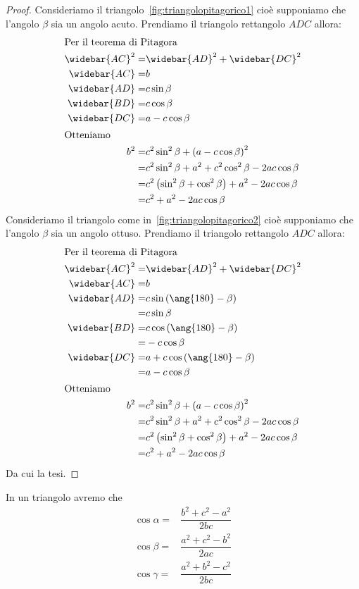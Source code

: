 \begin{proof}
	Consideriamo il triangolo~\vref{fig:triangolopitagorico1} cioè supponiamo che l'angolo $\beta$ sia un angolo acuto. Prendiamo il triangolo rettangolo $ADC$ allora:
	\begin{align*}
	\intertext{Per il teorema di Pitagora}
\widebar{AC}^2=&\widebar{AD}^2+\widebar{DC}^2\\
\widebar{AC}=&b\\
\widebar{AD}=&c\sin\beta\\
\widebar{BD}=&c\cos\beta\\
\widebar{DC}=&a-c\cos\beta\\
\intertext{Otteniamo}
b^2=&c^2\sin^2\beta+\left(a-c\cos\beta\right)^2\\
=&c^2\sin^2\beta+a^2+c^2\cos^2\beta-2ac\cos\beta\\
=&c^2\left(\sin^2\beta+\cos^2\beta\right)+a^2-2ac\cos\beta\\
=&c^2+a^2-2ac\cos\beta\\
	\end{align*}
	Consideriamo il triangolo come in~\vref{fig:triangolopitagorico2} cioè supponiamo che l'angolo $\beta$ sia un angolo ottuso. Prendiamo il triangolo rettangolo $ADC$ allora:
		\begin{align*}
	\intertext{Per il teorema di Pitagora}
	\widebar{AC}^2=&\widebar{AD}^2+\widebar{DC}^2\\
	\widebar{AC}=&b\\
	\widebar{AD}=&c\sin\left(\ang{180}-\beta\right)\\
	=&c\sin\beta\\
	\widebar{BD}=&c\cos\left(\ang{180}-\beta\right)\\
	=&-c\cos\beta\\
	\widebar{DC}=&a+c\cos\left(\ang{180}-\beta\right)\\
	=&a-c\cos\beta\\
	\intertext{Otteniamo}
	b^2=&c^2\sin^2\beta+\left(a-c\cos\beta\right)^2\\
	=&c^2\sin^2\beta+a^2+c^2\cos^2\beta-2ac\cos\beta\\
	=&c^2\left(\sin^2\beta+\cos^2\beta\right)+a^2-2ac\cos\beta\\
	=&c^2+a^2-2ac\cos\beta\\
	\end{align*}
	Da cui la tesi.
\end{proof}
\begin{cor}\label{cor:TeoremaCarnot1}
	In un triangolo avremo che
	\begin{align*}
	\cos\alpha=&\dfrac{b^2+c^2-a^2}{2bc}\\
	\cos\beta=&\dfrac{a^2+c^2-b^2}{2ac}\\
	\cos\gamma=&\dfrac{a^2+b^2-c^2}{2bc}\\
	\end{align*}
\end{cor}
